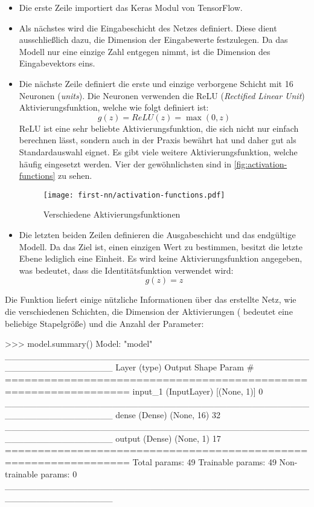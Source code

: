 \begin{itemize}
  \item Die erste Zeile importiert das Keras Modul von TensorFlow.
  \item Als nächstes wird die Eingabeschicht des Netzes definiert.
        Diese dient ausschließlich dazu, die Dimension der Eingabewerte festzulegen.
        Da das Modell nur eine einzige Zahl entgegen nimmt,
        ist die Dimension des Eingabevektors eins.
  \item Die nächste Zeile definiert die erste und einzige verborgene Schicht mit
        16 Neuronen (\textit{units}). Die Neuronen verwenden die ReLU
        (\textit{Rectified Linear Unit}) Aktivierungsfunktion, welche wie folgt
        definiert ist:
        \begin{equation}
          g(z) = ReLU(z) = \max(0, z)
        \end{equation}
        ReLU ist eine sehr beliebte Aktivierungsfunktion, die sich nicht
        nur einfach berechnen lässt, sondern auch in der Praxis bewährt hat
        und daher gut als Standardauswahl eignet. Es gibt viele
        weitere Aktivierungsfunktion, welche häufig eingesetzt werden.
        Vier der gewöhnlichsten sind in \autoref{fig:activation-functions}
        zu sehen.
        \begin{figure}[h!]
          \centering
          \texttt{[image: first-nn/activation-functions.pdf]}
          \caption{Verschiedene Aktivierungsfunktionen \parencite[292]{book:hands-on-ml}}
          \label{fig:activation-functions}
        \end{figure}
  \item Die letzten beiden Zeilen definieren die Ausgabeschicht und das endgültige
        Modell. Da das Ziel ist, einen einzigen Wert zu bestimmen, besitzt die letzte
        Ebene lediglich eine Einheit. Es wird keine Aktivierungsfunktion angegeben,
        was bedeutet, dass die Identitätsfunktion verwendet wird:
        \begin{equation}
          g(z) = z
        \end{equation}
\end{itemize}
Die  Funktion liefert einige nützliche Informationen
über das erstellte Netz, wie die verschiedenen Schichten, die Dimension
der Aktivierungen ( bedeutet eine beliebige Stapelgröße)
und die Anzahl der Parameter:
\begin{pyconcode}
>>> model.summary()
Model: "model"
_________________________________________________________________
Layer (type)                 Output Shape              Param #   
=================================================================
input_1 (InputLayer)         [(None, 1)]               0         
_________________________________________________________________
dense (Dense)                (None, 16)                32        
_________________________________________________________________
output (Dense)               (None, 1)                 17        
=================================================================
Total params: 49
Trainable params: 49
Non-trainable params: 0
_________________________________________________________________
\end{pyconcode}
